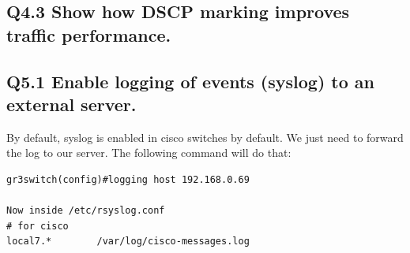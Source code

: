 \documentclass{article}
\begin{document}
\subsection{Q4.3 Show how DSCP marking improves traffic performance.}



\subsection{Q5.1 Enable logging of events (syslog) to an external server.}

By default, syslog is enabled in cisco switches by default. We just need to forward the log to our server. The following command will do that:

\begin{verbatim}
gr3switch(config)#logging host 192.168.0.69

Now inside /etc/rsyslog.conf 
# for cisco
local7.*        /var/log/cisco-messages.log
\end{verbatim}
\end{document}

